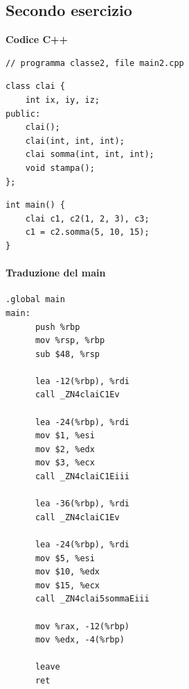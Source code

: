\documentclass[11pt]{report}
\theoremstyle{definition}
\begin{document}
\subsection{Secondo esercizio}
\begin{framed}
\noindent \textbf{Codice C++}
\begin{verbatim}
// programma classe2, file main2.cpp
\end{verbatim}
\begin{multicols}{2}
\begin{verbatim}
class clai { 
    int ix, iy, iz;
public:
    clai();
    clai(int, int, int);
    clai somma(int, int, int);
    void stampa();
};
\end{verbatim}
\columnbreak
\begin{verbatim}
int main() { 
    clai c1, c2(1, 2, 3), c3;
    c1 = c2.somma(5, 10, 15); 
}
\end{verbatim}
\end{multicols}
\end{framed}
\begin{multicols}{2}
\paragraph{Traduzione del main}
\begin{verbatim}
.global main
main:
      push %rbp
      mov %rsp, %rbp
      sub $48, %rsp
      
      lea -12(%rbp), %rdi
      call _ZN4claiC1Ev
      
      lea -24(%rbp), %rdi
      mov $1, %esi
      mov $2, %edx
      mov $3, %ecx
      call _ZN4claiC1Eiii
      
      lea -36(%rbp), %rdi
      call _ZN4claiC1Ev
      
      lea -24(%rbp), %rdi
      mov $5, %esi
      mov $10, %edx
      mov $15, %ecx
      call _ZN4clai5sommaEiii
      
      mov %rax, -12(%rbp)
      mov %edx, -4(%rbp)
      
      leave
      ret
\end{verbatim}
\end{multicols}
\end{document}
